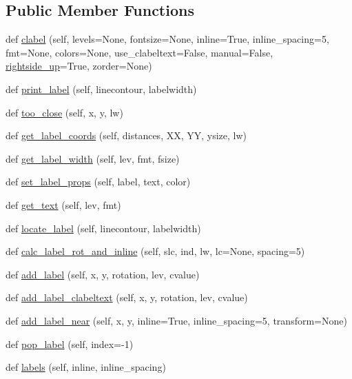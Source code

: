\subsection*{Public Member Functions}
\begin{DoxyCompactItemize}
\item 
def \hyperlink{classmatplotlib_1_1contour_1_1ContourLabeler_a0070dd0497a08bbc4e29a43ace021ae6}{clabel} (self, levels=None, fontsize=None, inline=True, inline\+\_\+spacing=5, fmt=None, colors=None, use\+\_\+clabeltext=False, manual=False, \hyperlink{classmatplotlib_1_1contour_1_1ContourLabeler_a6483793952df92f50ddb5c0fa115db45}{rightside\+\_\+up}=True, zorder=None)
\item 
def \hyperlink{classmatplotlib_1_1contour_1_1ContourLabeler_a33db42d6dad5763e88663799c9365c46}{print\+\_\+label} (self, linecontour, labelwidth)
\item 
def \hyperlink{classmatplotlib_1_1contour_1_1ContourLabeler_afd89f73ee072c09db61c460d19cea5b5}{too\+\_\+close} (self, x, y, lw)
\item 
def \hyperlink{classmatplotlib_1_1contour_1_1ContourLabeler_a79eb62874fa44f4cfe8a8cf7919d47ed}{get\+\_\+label\+\_\+coords} (self, distances, XX, YY, ysize, lw)
\item 
def \hyperlink{classmatplotlib_1_1contour_1_1ContourLabeler_ab09cfd2d4503742b0d2c1df282445e05}{get\+\_\+label\+\_\+width} (self, lev, fmt, fsize)
\item 
def \hyperlink{classmatplotlib_1_1contour_1_1ContourLabeler_aabbd218f1881b7e660560b9cbd556966}{set\+\_\+label\+\_\+props} (self, label, text, color)
\item 
def \hyperlink{classmatplotlib_1_1contour_1_1ContourLabeler_a891b8a9f8a7a03f4d8a3cea0f37f9a2c}{get\+\_\+text} (self, lev, fmt)
\item 
def \hyperlink{classmatplotlib_1_1contour_1_1ContourLabeler_a410a16ec39cff4f6525a20b4dc45e229}{locate\+\_\+label} (self, linecontour, labelwidth)
\item 
def \hyperlink{classmatplotlib_1_1contour_1_1ContourLabeler_aa03055e5f3a393a1bfb5a440aca5f6bf}{calc\+\_\+label\+\_\+rot\+\_\+and\+\_\+inline} (self, slc, ind, lw, lc=None, spacing=5)
\item 
def \hyperlink{classmatplotlib_1_1contour_1_1ContourLabeler_a58dbf28d7f287d2f99d39e1305a379f1}{add\+\_\+label} (self, x, y, rotation, lev, cvalue)
\item 
def \hyperlink{classmatplotlib_1_1contour_1_1ContourLabeler_a4af9e95c9e59f316f0acd3e275376781}{add\+\_\+label\+\_\+clabeltext} (self, x, y, rotation, lev, cvalue)
\item 
def \hyperlink{classmatplotlib_1_1contour_1_1ContourLabeler_a3fa1b16da47d68a2ffec7ecd32a4fd80}{add\+\_\+label\+\_\+near} (self, x, y, inline=True, inline\+\_\+spacing=5, transform=None)
\item 
def \hyperlink{classmatplotlib_1_1contour_1_1ContourLabeler_ada58b1416362444ee95f0cd91500f932}{pop\+\_\+label} (self, index=-\/1)
\item 
def \hyperlink{classmatplotlib_1_1contour_1_1ContourLabeler_ac1a3f2aec4f02436937755a215efcfea}{labels} (self, inline, inline\+\_\+spacing)
\end{DoxyCompactItemize}
